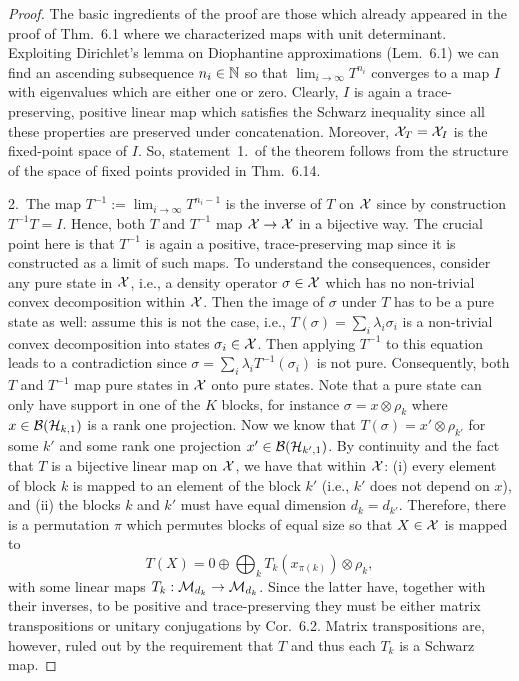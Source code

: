 \documentclass[11pt,a4paper]{article}
\theoremstyle{plain}
\theoremstyle{definition}
\theoremstyle{remark}
\begin{document}
\begin{proof}
    The basic ingredients of the proof are those which already appeared in the proof
    of Thm.~6.1 where we characterized maps with unit determinant. Exploiting
    Dirichlet's lemma on Diophantine approximations (Lem.~6.1) we can find an
    ascending subsequence $n_i\in\mathbb{N}$ so that $\lim_{i\to\infty} T^{n_i}$ converges
    to a map $I$ with eigenvalues which are either one or zero. Clearly, $I$ is again
    a trace-preserving, positive linear map which satisfies the Schwarz inequality
    since all these properties are preserved under concatenation. Moreover,
    $\mathcal{X}_T=\mathcal{X}_I$ is the fixed-point space of $I$. So, statement~1.\ of the theorem
    follows from the structure of the space of fixed points provided in Thm.~6.14.

    2.\ The map $T^{-1}:=\lim_{i\to\infty} T^{n_i-1}$ is the inverse of $T$ on $\mathcal{X}$
    since by construction $T^{-1}T=I$. Hence, both $T$ and $T^{-1}$ map $\mathcal{X}\to\mathcal{X}$
    in a bijective way. The crucial point here is that $T^{-1}$ is again a positive,
    trace-preserving map since it is constructed as a limit of such maps. To
    understand the consequences, consider any pure state in $\mathcal{X}$, i.e., a density
    operator $\sigma\in\mathcal{X}$ which has no non-trivial convex decomposition within
    $\mathcal{X}$. Then the image of $\sigma$ under $T$ has to be a pure state as well:
    assume this is not the case, i.e., $T(\sigma)=\sum_i \lambda_i \sigma_i$ is a
    non-trivial convex decomposition into states $\sigma_i\in\mathcal{X}$. Then applying
    $T^{-1}$ to this equation leads to a contradiction since
    $\sigma=\sum_i \lambda_i T^{-1}(\sigma_i)$ is not pure. Consequently, both $T$
    and $T^{-1}$ map pure states in $\mathcal{X}$ onto pure states. Note that a pure state
    can only have support in one of the $K$ blocks, for instance $\sigma=x\otimes\rho_k$
    where $x\in\mathcal{B}(\mathcal{H}_{k,1})$ is a rank one projection. Now we know that
    $T(\sigma)=x'\otimes \rho_{k'}$ for some $k'$ and some rank one projection
    $x'\in\mathcal{B}(\mathcal{H}_{k',1})$. By continuity and the fact that $T$ is a bijective linear
    map on $\mathcal{X}$, we have that within $\mathcal{X}$: (i) every element of block $k$ is mapped
    to an element of the block $k'$ (i.e., $k'$ does not depend on $x$), and (ii) the
    blocks $k$ and $k'$ must have equal dimension $d_k=d_{k'}$. Therefore, there is a
    permutation $\pi$ which permutes blocks of equal size so that $X\in\mathcal{X}$ is mapped to
    \[
        T(X) = 0 \oplus \bigoplus_k T_k(x_{\pi(k)})\otimes \rho_k,
    \]
    with some linear maps $T_k:\mathcal{M}_{d_k}\to\mathcal{M}_{d_k}$. Since the latter have, together
    with their inverses, to be positive and trace-preserving they must be either matrix
    transpositions or unitary conjugations by Cor.~6.2. Matrix transpositions are,
    however, ruled out by the requirement that $T$ and thus each $T_k$ is a Schwarz map.
\end{proof}
\end{document}
